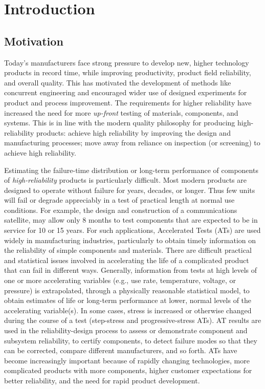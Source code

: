\section{Introduction}
\label{section:intro.at.models}
\subsection{Motivation}
Today's manufacturers face strong pressure to develop new, higher
technology products in record time, while improving productivity,
product field reliability, and overall quality.  This has motivated
the development of methods like concurrent engineering and
encouraged wider use of designed experiments for product and process
improvement.  The requirements for higher reliability have increased
the need for more {\em up-front} testing of materials, components,
and systems. This is in line with the modern quality philosophy for
producing high-reliability products: achieve high reliability by
improving the design and manufacturing processes; move away from
reliance on inspection (or screening) to achieve high reliability.

Estimating the failure-time distribution or long-term performance of
components of {\em high-reliability} products is particularly
difficult.  Most modern products are designed to operate without
failure for years, decades, or longer. Thus few units will fail or
degrade appreciably in a test of practical length at normal use
conditions. For example, the design and construction of a
communications satellite, may allow only 8 months to test components
that are expected to be in service for 10 or 15 years.  For such
applications, Accelerated Tests (ATs) are used widely in
manufacturing industries, particularly to obtain timely information
on the reliability of simple components and materials.  There are
difficult practical and statistical issues involved in accelerating
the life of a complicated product that can fail in different ways.
Generally, information from tests at high levels of one or more
accelerating variables (e.g., use rate, temperature, voltage, or
pressure) is extrapolated, through a physically reasonable
statistical model, to obtain estimates of life or long-term
performance at lower, normal levels of the accelerating variable(s).
In some cases, stress is increased or otherwise changed during the
course of a test (step-stress and progressive-stress ATs).  AT
results are used in the reliability-design process to assess or
demonstrate component and subsystem reliability, to certify
components, to detect failure modes so that they can be corrected,
compare different manufacturers, and so forth.  ATs have become
increasingly important because of rapidly changing technologies,
more complicated products with more components, higher customer
expectations for better reliability, and the need for rapid product
development.

